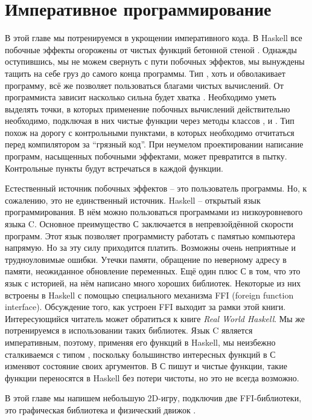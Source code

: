 \chapter{Императивное программирование}

В этой главе мы потренируемся в укрощении императивного кода. В Haskell
все побочные эффекты огорожены от чистых функций бетонной стеной
. Однажды оступившись, мы не можем свернуть с пути побочных
эффектов, мы вынуждены тащить на себе груз  до самого конца
программы. Тип , хоть и обволакивает программу, всё же позволяет
пользоваться благами чистых вычислений. От программиста зависит
насколько сильна будет хватка . Необходимо уметь выделять точки,
в которых применение побочных вычислений действительно необходимо,
подключая в них чистые функции через методы классов ,
 и . Тип  похож на дорогу с
контрольными пунктами, в которых необходимо отчитаться перед
компилятором за ``грязный код''. При неумелом проектировании написание
программ, насыщенных побочными эффектами, может превратится в пытку.
Контрольные пункты будут встречаться в каждой функции.

Естественный источник побочных эффектов -- это пользователь программы.
Но, к сожалению, это не единственный источник. Haskell -- открытый язык
программирования. В нём можно пользоваться программами из
низкоуровневого языка C. Основное преимущество С заключается в
непревзойдённой скорости программ. Этот язык позволяет программисту
работать с памятью компьютера напрямую. Но за эту силу приходится
платить. Возможны очень неприятные и трудноуловимые ошибки. Утечки
памяти, обращение по неверному адресу в памяти, неожиданное обновление
переменных. Ещё один плюс С в том, что это язык с историей, на нём
написано много хороших библиотек. Некоторые из них встроены в Haskell с
помощью специального механизма FFI (foreign function interface).
Обсуждение того, как устроен FFI выходит за рамки этой книги.
Интересующийся читатель может обратиться к книге \emph{Real World
Haskell}. Мы же потренируемся в использовании таких библиотек. Язык C
является императивным, поэтому, применяя его функций в Haskell, мы
неизбежно сталкиваемся с типом , поскольку большинство интересных
функций в С изменяют состояние своих аргументов. В С пишут и чистые
функции, такие функции переносятся в Haskell без потери чистоты, но это
не всегда возможно.

В этой главе мы напишем небольшую 2D-игру, подключив две FFI-библиотеки,
это графическая библиотека  и физический движок
.

